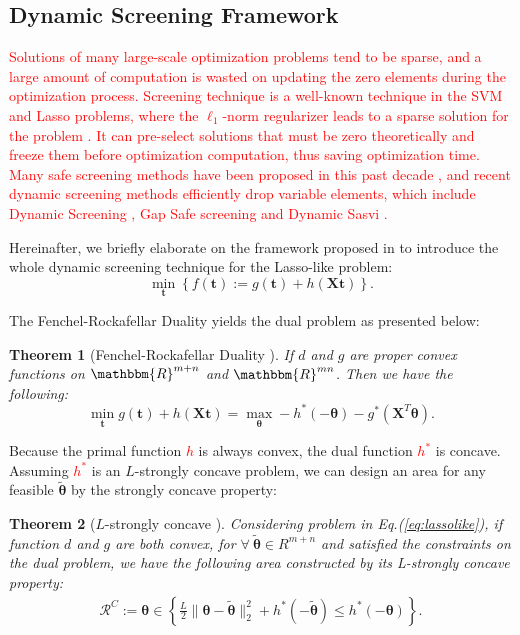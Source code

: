 \documentclass[twoside]{article}
\theoremstyle{plain}
\newtheorem{thm}{Theorem}
\newcommand{\tranT}{T}
\newcommand{\mat}[1]{\mathbf{#1}}
\renewcommand{\vec}[1]{\bm{#1}}
\newcommand{\changeHK}[1]{\textcolor{red}{#1}}
\begin{document}
\subsection{Dynamic Screening Framework}
\changeHK{
Solutions of many large-scale optimization problems tend to be sparse, and a large amount of computation is wasted on updating the zero elements during the optimization process. Screening technique is a well-known technique in the SVM \citep{Ogawa_ICML_2013} and Lasso problems, where the $\ell_1$-norm regularizer leads to a sparse solution for the problem \citep{ghaoui2010safe}. It can pre-select solutions that must be zero theoretically and freeze them before optimization computation, thus saving optimization time. Many safe screening methods have been proposed in this past decade \citep{Liu_ICML_2014,Wang_JMLR_2015}, and recent dynamic screening methods efficiently drop variable elements, which include Dynamic Screening \citep{7128732}, Gap Safe screening \citep{JMLR:v18:16-577} and Dynamic Sasvi \citep{NEURIPS2021_7b5b23f4}.}

Hereinafter, we briefly elaborate on the framework proposed in \citep{NEURIPS2021_7b5b23f4} to introduce the whole dynamic screening technique for the Lasso-like problem:
\begin{equation}
\label{eq:lassolike}
\min_{\vec{t}} \left\{ f(\vec{t}) := g(\vec{t}) + h(\mat{X} \vec{t}) \right\}.
\end{equation}

The Fenchel-Rockafellar Duality yields the dual problem as presented below:
\begin{thm}[Fenchel-Rockafellar Duality {\citep{Rockafellar_Springer_1998}}] 
\label{Thm:FRD}
If $d$ and $g$ are proper convex functions on $\mathbbm{R}^{m+n}$ and $\mathbbm{R}^{mn}$. Then we have the following:
\begin{equation*}
\min_{\vec{t}} g(\vec{t}) + h(\mat{X}\vec{t}) = \max_{\vec{\vec{\theta}}} -h^*(-\vec{\theta})-g^*(\mat{X}^{\tranT}\vec{\theta}).
\end{equation*}
\end{thm}

Because the primal function \changeHK{$h$} is always convex, the dual function \changeHK{$h^*$} is concave. Assuming \changeHK{$h^*$} is an $L$-strongly concave problem, we can design an area for any feasible $\tilde{\vec{\theta}}$ by the strongly concave property:

\begin{thm}[$L$-strongly concave {\citep[Theorem 5]{NEURIPS2021_7b5b23f4}}]\label{circle}
Considering problem in Eq.(\ref{eq:lassolike}), if function $d$ and $g$ are both convex, for $\forall \ \tilde{\vec{\theta}} \in{R^{m+n}}$ and satisfied the constraints on the dual problem, we have the following area constructed by its L-strongly concave property:  
$$
\begin{aligned}
\mathcal{R}^{C}:=\vec{\theta} \in \left\{\frac{L}{2}\|\vec{\theta}-\tilde{\vec{\theta}}\|_2^2+h^*(-\tilde{\vec{\theta}}) \leq h^*(-\vec{\theta})\right\}.
\end{aligned}
$$
\end{thm}
\end{document}
